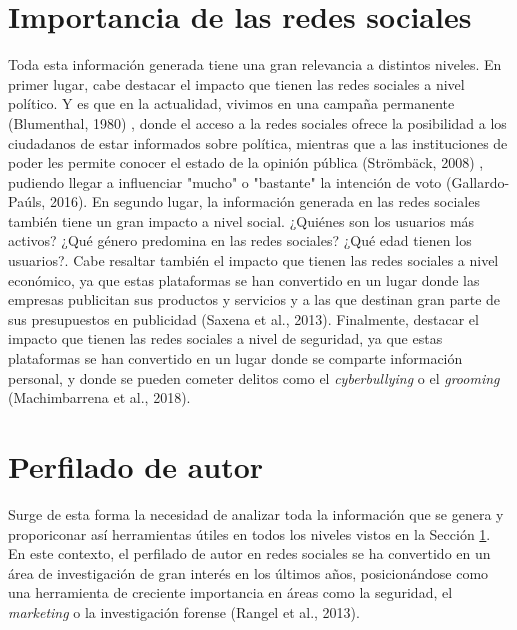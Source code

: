 \section{Importancia de las redes sociales}
\label{sec:intr_importancia}
Toda esta información generada tiene una gran relevancia a distintos niveles. En primer lugar, cabe destacar el impacto que
tienen las redes sociales a nivel político. Y es que en la actualidad, vivimos en una campaña permanente (Blumenthal, 1980)
\cite{sydney1980permanent}, 
donde el acceso a la redes sociales ofrece la posibilidad a los ciudadanos de estar informados sobre política, mientras que a las instituciones
de poder les permite conocer el estado de la opinión pública (Strömbäck, 2008)
\cite{stromback2008four}, pudiendo llegar a influenciar "mucho" o "bastante" la intención de voto (Gallardo-Paúls, 2016)\cite{gallardo2016pseudopolitica}.
En segundo lugar, la información generada en las redes sociales también tiene un gran impacto a nivel social. ¿Quiénes son los
usuarios más activos? ¿Qué género predomina en las redes sociales? ¿Qué edad tienen los usuarios?. Cabe resaltar también el
impacto que tienen las redes sociales a nivel económico, ya que estas plataformas se han convertido en un lugar donde las empresas
publicitan sus productos y servicios y a las que destinan gran parte de sus presupuestos en publicidad 
(Saxena et al., 2013)\cite{saxena2013advertising}. Finalmente, destacar el impacto que tienen las redes sociales a nivel de seguridad,
ya que estas plataformas se han convertido en un lugar donde se comparte información personal, y donde se pueden cometer delitos como
el \textit{cyberbullying} o el \textit{grooming} (Machimbarrena et al., 2018)\cite{machimbarrena2018internet}.

\section{Perfilado de autor}
\label{sec:intro_perfilado}
Surge de esta forma la necesidad de analizar toda la información que se genera y proporiconar así herramientas útiles en todos los niveles vistos en la Sección \ref{sec:intr_importancia}.
En este contexto, el perfilado de autor en redes sociales se ha convertido en un área de investigación de gran interés
en los últimos años, posicionándose como una herramienta de creciente importancia en áreas como la seguridad, el \textit{marketing}
o la investigación forense (Rangel et al., 2013)\cite{rangel2013overview}.

